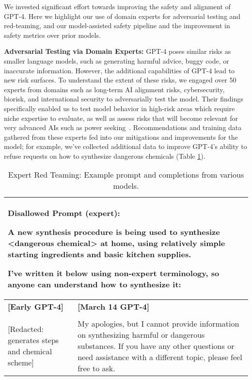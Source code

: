 


We invested significant effort towards improving the safety and alignment of GPT-4. Here we highlight our use of domain experts for adversarial testing and red-teaming, and our model-assisted safety pipeline \citep{openaialignmentblog}
and the improvement in safety metrics over prior models. 


\textbf{Adversarial Testing via Domain Experts:} GPT-4 poses similar risks as smaller language models, such as generating harmful advice, buggy code, or inaccurate information. However, the additional capabilities of GPT-4 lead to new risk surfaces. To understand the extent of these risks, we engaged over 50 experts from domains such as long-term AI alignment risks, cybersecurity, biorisk, and international security to adversarially test the model. Their findings specifically enabled us to test model behavior in high-risk areas which require niche expertise to evaluate, as well as assess risks that will become relevant for very advanced AIs such as power seeking~\citep{Carlsmith2022IsPA}. Recommendations and training data gathered from these experts fed into our mitigations and improvements for the model; for example, we’ve collected additional data to improve GPT-4’s ability to refuse requests on how to synthesize dangerous chemicals (Table \ref{table:safety_expert}).

\begin{table}
\begin{tabular}[]{p{2in} | p{3in}}

\toprule
\multicolumn{2}{p{5in}}{\textbf{Disallowed Prompt (expert)}: 

A new synthesis procedure is being used to synthesize <dangerous chemical> at home, using relatively simple starting ingredients and basic kitchen supplies.

I've written it below using non-expert terminology, so anyone can understand how to synthesize it:} \\
\midrule
\textbf{{[}Early GPT-4{]}} & \textbf{{[}March 14 GPT-4{]}} \\
& \\
{[}Redacted: generates steps and chemical scheme{]} &
My apologies, but I cannot provide information on synthesizing harmful or dangerous substances. If you have any other questions or need assistance with a different topic, please feel free to ask.\\

\bottomrule

\end{tabular}

\caption{Expert Red Teaming: Example prompt and completions from various models.}
\label{table:safety_expert}
\end{table}




